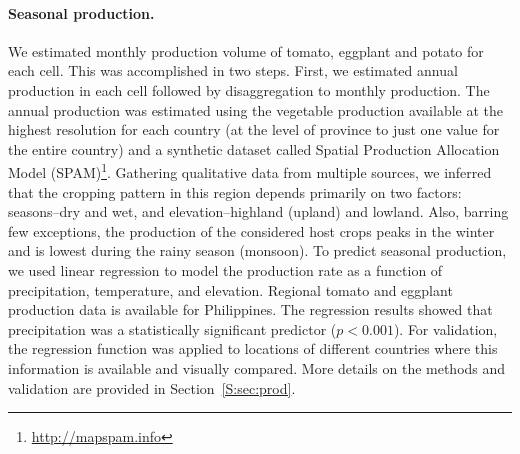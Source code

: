 \documentclass[11pt]{article}
\theoremstyle{definition}
\begin{document}
\paragraph{Seasonal production.} We estimated monthly production volume of
tomato, eggplant and potato for each cell. This was accomplished in two
steps. First, we estimated annual production in each cell followed by
disaggregation to monthly production. The annual production was estimated
using the vegetable production available at the highest resolution for each
country (at the level of province to just one value for the entire country)
and a synthetic dataset called Spatial Production Allocation Model
(SPAM)\footnote{\url{http://mapspam.info}}. Gathering qualitative data from
multiple sources, we inferred that the cropping pattern in this region
depends primarily on two factors: seasons--dry and wet, and
elevation--highland (upland) and lowland. Also, barring few exceptions, the
production of the considered host crops peaks in the winter and is lowest
during the rainy season (monsoon).  To predict seasonal production, we used
linear regression to model the production rate as a function of
precipitation, temperature, and elevation. Regional tomato and eggplant
production data is available for Philippines.
The regression results showed that
precipitation was a statistically significant
predictor ($p <0.001$). For validation, the regression function was
applied to locations of different countries where this information is
available and visually compared. More details on the methods and validation are
provided in Section~\ref{S:sec:prod}. 
\end{document}
